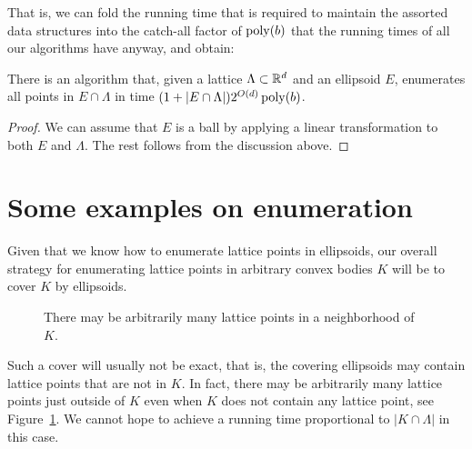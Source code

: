 That is, we can fold the running time that is required to maintain the assorted data structures
into the catch-all factor of $\operatorname{poly}(b)$ that the running times of all our algorithms have anyway,
and obtain:

\begin{theorem}
  There is an algorithm that,
  given a lattice $\Lambda \subset \mathbb{R}^d$ and an ellipsoid $E$,
  enumerates all points in $E \cap \Lambda$ in time
  $(1 + |E \cap \Lambda|) 2^{O(d)} \operatorname{poly}(b)$.
\end{theorem}
\begin{proof}
  We can assume that $E$ is a ball by applying a linear transformation to both $E$ and $\Lambda$.
  The rest follows from the discussion above.
\end{proof}





\section{Some examples on enumeration}

Given that we know how to enumerate lattice points in ellipsoids,
our overall strategy for enumerating lattice points in arbitrary convex bodies $K$
will be to cover $K$ by ellipsoids.

\begin{figure}
  \begin{center}
  \end{center}
  \caption{There may be arbitrarily many lattice points in a neighborhood of $K$.}
  \label{fig:sparse-dense-close-to-K}
\end{figure}

Such a cover will usually not be exact, that is,
the covering ellipsoids may contain lattice points that are not in $K$.
In fact, there may be arbitrarily many lattice points just outside of $K$
even when $K$ does not contain any lattice point,
see Figure~\ref{fig:sparse-dense-close-to-K}.
We cannot hope to achieve a running time proportional to $|K \cap \Lambda|$ in this case.

